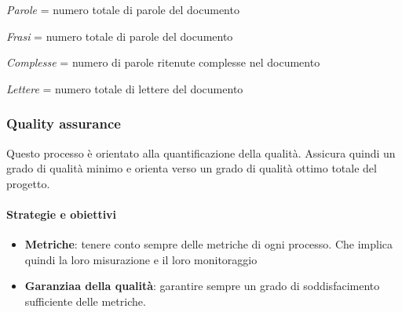             \hphantom{}
         \def\productquality{
                            {   Gunning's fog index,
                                $0.4*(\frac{ Parole}{Frasi} + 100* \frac{Complesse}{ Frasi})$, 
                                $ \geq 16$,
                                $ \geq 12 $
                            },
                            {   Gulpease index,
                                $89 + (300*Frasi - 10*\frac{Lettere}{Parole}$, 
                                $40 < IG \leq 100$,
                                $80 < IG \leq 100$
                            },
                            {   Correttezza ortografica,
                                numero totale di errori, 
                                0,
                                0
                            },
                        }
                    
                    
        \textit{Parole} = numero totale di parole del documento
        
        \textit{Frasi} = numero totale di parole del documento
        
        \textit{Complesse} = numero di parole ritenute complesse nel documento
        
        \textit{Lettere} = numero totale di lettere del documento
                    
            \subsubsection{Quality assurance}
            Questo processo è orientato alla quantificazione della qualità. Assicura quindi un grado di qualità minimo e orienta verso un grado di qualità ottimo totale del progetto.
            
            \paragraph{Strategie e obiettivi}
            \begin{itemize}
                \item \textbf{Metriche}: tenere conto sempre delle metriche di ogni processo. Che implica quindi la loro misurazione e il loro monitoraggio
                \item \textbf{Garanziaa della qualità}: garantire sempre un grado di soddisfacimento sufficiente delle metriche.
            \end{itemize}
            

